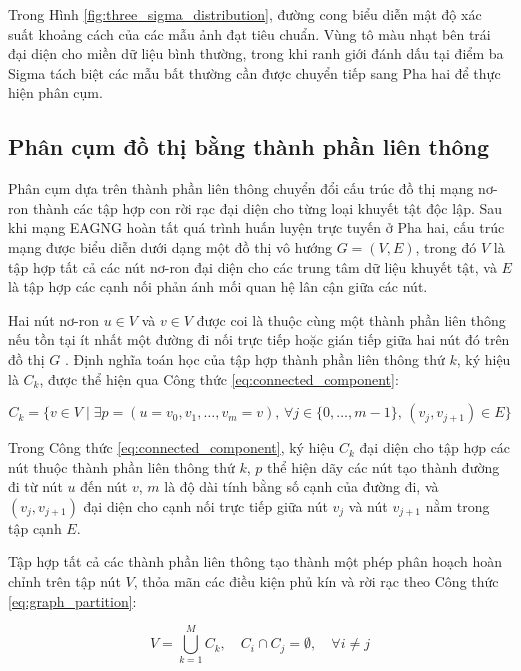 Trong Hình \ref{fig:three_sigma_distribution}, đường cong biểu diễn mật độ xác suất khoảng cách của các mẫu ảnh đạt tiêu chuẩn. Vùng tô màu nhạt bên trái đại diện cho miền dữ liệu bình thường, trong khi ranh giới đánh dấu tại điểm ba Sigma tách biệt các mẫu bất thường cần được chuyển tiếp sang Pha hai để thực hiện phân cụm.

\subsection{Phân cụm đồ thị bằng thành phần liên thông}

Phân cụm dựa trên thành phần liên thông chuyển đổi cấu trúc đồ thị mạng nơ-ron thành các tập hợp con rời rạc đại diện cho từng loại khuyết tật độc lập. Sau khi mạng EAGNG hoàn tất quá trình huấn luyện trực tuyến ở Pha hai, cấu trúc mạng được biểu diễn dưới dạng một đồ thị vô hướng $G = (V, E)$, trong đó $V$ là tập hợp tất cả các nút nơ-ron đại diện cho các trung tâm dữ liệu khuyết tật, và $E$ là tập hợp các cạnh nối phản ánh mối quan hệ lân cận giữa các nút.

Hai nút nơ-ron $u \in V$ và $v \in V$ được coi là thuộc cùng một thành phần liên thông nếu tồn tại ít nhất một đường đi nối trực tiếp hoặc gián tiếp giữa hai nút đó trên đồ thị $G$ \cite{hopcroft1973algorithm}. Định nghĩa toán học của tập hợp thành phần liên thông thứ $k$, ký hiệu là $C_k$, được thể hiện qua Công thức \ref{eq:connected_component}:

\begin{equation}
C_k = \{ v \in V \mid \exists p = (u = v_0, v_1, \dots, v_m = v), \, \forall j \in \{0, \dots, m-1\}, \, (v_j, v_{j+1}) \in E \}
\label{eq:connected_component}
\end{equation}

Trong Công thức \ref{eq:connected_component}, ký hiệu $C_k$ đại diện cho tập hợp các nút thuộc thành phần liên thông thứ $k$, $p$ thể hiện dãy các nút tạo thành đường đi từ nút $u$ đến nút $v$, $m$ là độ dài tính bằng số cạnh của đường đi, và $(v_j, v_{j+1})$ đại diện cho cạnh nối trực tiếp giữa nút $v_j$ và nút $v_{j+1}$ nằm trong tập cạnh $E$.

Tập hợp tất cả các thành phần liên thông tạo thành một phép phân hoạch hoàn chỉnh trên tập nút $V$, thỏa mãn các điều kiện phủ kín và rời rạc theo Công thức \ref{eq:graph_partition}:

\begin{equation}
V = \bigcup_{k=1}^{M} C_k, \quad C_i \cap C_j = \emptyset, \quad \forall i \neq j
\label{eq:graph_partition}
\end{equation}

